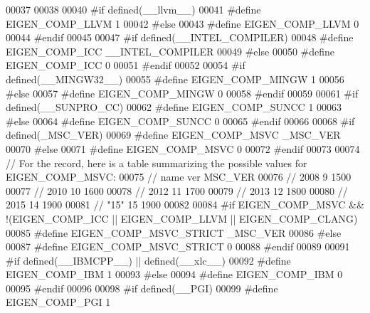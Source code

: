 \begin{DoxyCode}
00037 
00038 
00040 \textcolor{preprocessor}{#if defined(\_\_llvm\_\_)}
00041 \textcolor{preprocessor}{  #define EIGEN\_COMP\_LLVM 1}
00042 \textcolor{preprocessor}{#else}
00043 \textcolor{preprocessor}{  #define EIGEN\_COMP\_LLVM 0}
00044 \textcolor{preprocessor}{#endif}
00045 
00047 \textcolor{preprocessor}{#if defined(\_\_INTEL\_COMPILER)}
00048 \textcolor{preprocessor}{  #define EIGEN\_COMP\_ICC \_\_INTEL\_COMPILER}
00049 \textcolor{preprocessor}{#else}
00050 \textcolor{preprocessor}{  #define EIGEN\_COMP\_ICC 0}
00051 \textcolor{preprocessor}{#endif}
00052 
00054 \textcolor{preprocessor}{#if defined(\_\_MINGW32\_\_)}
00055 \textcolor{preprocessor}{  #define EIGEN\_COMP\_MINGW 1}
00056 \textcolor{preprocessor}{#else}
00057 \textcolor{preprocessor}{  #define EIGEN\_COMP\_MINGW 0}
00058 \textcolor{preprocessor}{#endif}
00059 
00061 \textcolor{preprocessor}{#if defined(\_\_SUNPRO\_CC)}
00062 \textcolor{preprocessor}{  #define EIGEN\_COMP\_SUNCC 1}
00063 \textcolor{preprocessor}{#else}
00064 \textcolor{preprocessor}{  #define EIGEN\_COMP\_SUNCC 0}
00065 \textcolor{preprocessor}{#endif}
00066 
00068 \textcolor{preprocessor}{#if defined(\_MSC\_VER)}
00069 \textcolor{preprocessor}{  #define EIGEN\_COMP\_MSVC \_MSC\_VER}
00070 \textcolor{preprocessor}{#else}
00071 \textcolor{preprocessor}{  #define EIGEN\_COMP\_MSVC 0}
00072 \textcolor{preprocessor}{#endif}
00073 
00074 \textcolor{comment}{// For the record, here is a table summarizing the possible values for EIGEN\_COMP\_MSVC:}
00075 \textcolor{comment}{//  name  ver   MSC\_VER}
00076 \textcolor{comment}{//  2008    9      1500}
00077 \textcolor{comment}{//  2010   10      1600}
00078 \textcolor{comment}{//  2012   11      1700}
00079 \textcolor{comment}{//  2013   12      1800}
00080 \textcolor{comment}{//  2015   14      1900}
00081 \textcolor{comment}{//  "15"   15      1900}
00082 
00084 \textcolor{preprocessor}{#if EIGEN\_COMP\_MSVC && !(EIGEN\_COMP\_ICC || EIGEN\_COMP\_LLVM || EIGEN\_COMP\_CLANG)}
00085 \textcolor{preprocessor}{  #define EIGEN\_COMP\_MSVC\_STRICT \_MSC\_VER}
00086 \textcolor{preprocessor}{#else}
00087 \textcolor{preprocessor}{  #define EIGEN\_COMP\_MSVC\_STRICT 0}
00088 \textcolor{preprocessor}{#endif}
00089 
00091 \textcolor{preprocessor}{#if defined(\_\_IBMCPP\_\_) || defined(\_\_xlc\_\_)}
00092 \textcolor{preprocessor}{  #define EIGEN\_COMP\_IBM 1}
00093 \textcolor{preprocessor}{#else}
00094 \textcolor{preprocessor}{  #define EIGEN\_COMP\_IBM 0}
00095 \textcolor{preprocessor}{#endif}
00096 
00098 \textcolor{preprocessor}{#if defined(\_\_PGI)}
00099 \textcolor{preprocessor}{  #define EIGEN\_COMP\_PGI 1}

\end{DoxyCode}
